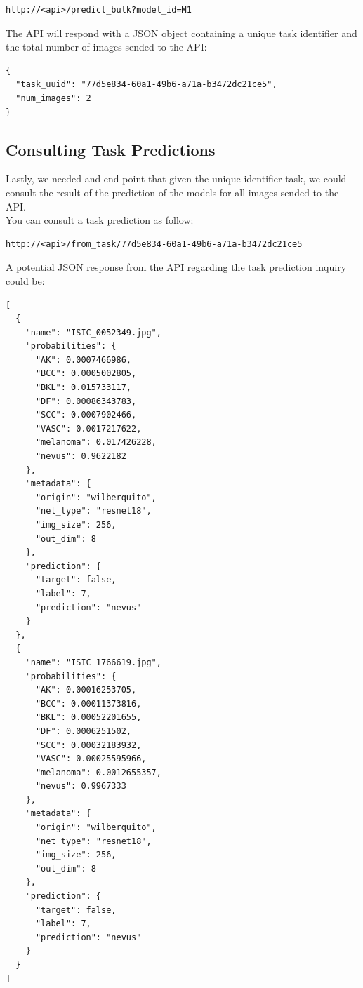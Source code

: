 \begin{Verbatim}[fontsize=\scriptsize]
http://<api>/predict_bulk?model_id=M1
\end{Verbatim}

The API will respond with a JSON object containing a unique task identifier
and the total number of images sended to the API:

\begin{Verbatim}[fontsize=\scriptsize]
{
  "task_uuid": "77d5e834-60a1-49b6-a71a-b3472dc21ce5",
  "num_images": 2
}
\end{Verbatim}


\subsection{Consulting Task Predictions}

Lastly, we needed and end-point that given the unique identifier task,
we could consult the result of the prediction of the models for all images
sended to the API. \\

You can consult a task prediction as follow:

\begin{Verbatim}[fontsize=\scriptsize]
http://<api>/from_task/77d5e834-60a1-49b6-a71a-b3472dc21ce5
\end{Verbatim}

A potential JSON response from the API regarding the task prediction inquiry
could be:

\begin{Verbatim}[fontsize=\scriptsize]
[
  {
    "name": "ISIC_0052349.jpg",
    "probabilities": {
      "AK": 0.0007466986,
      "BCC": 0.0005002805,
      "BKL": 0.015733117,
      "DF": 0.00086343783,
      "SCC": 0.0007902466,
      "VASC": 0.0017217622,
      "melanoma": 0.017426228,
      "nevus": 0.9622182
    },
    "metadata": {
      "origin": "wilberquito",
      "net_type": "resnet18",
      "img_size": 256,
      "out_dim": 8
    },
    "prediction": {
      "target": false,
      "label": 7,
      "prediction": "nevus"
    }
  },
  {
    "name": "ISIC_1766619.jpg",
    "probabilities": {
      "AK": 0.00016253705,
      "BCC": 0.00011373816,
      "BKL": 0.00052201655,
      "DF": 0.0006251502,
      "SCC": 0.00032183932,
      "VASC": 0.00025595966,
      "melanoma": 0.0012655357,
      "nevus": 0.9967333
    },
    "metadata": {
      "origin": "wilberquito",
      "net_type": "resnet18",
      "img_size": 256,
      "out_dim": 8
    },
    "prediction": {
      "target": false,
      "label": 7,
      "prediction": "nevus"
    }
  }
]
\end{Verbatim}

